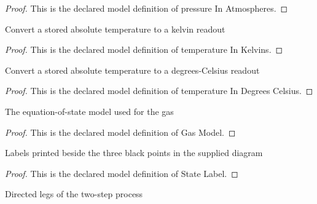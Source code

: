 \begin{proof}
  This is the declared model definition of pressure In Atmospheres.
\end{proof}
\begin{definition}
  \label{def:physics:phyx-mini-0476:phyxminiproblems-problemphyxmini0476-temperatureinkelvins}
  Convert a stored absolute temperature to a kelvin readout
\end{definition}
\begin{proof}
  This is the declared model definition of temperature In Kelvins.
\end{proof}
\begin{definition}
  \label{def:physics:phyx-mini-0476:phyxminiproblems-problemphyxmini0476-temperatureindegreescelsius}
  Convert a stored absolute temperature to a degrees-Celsius readout
\end{definition}
\begin{proof}
  This is the declared model definition of temperature In Degrees Celsius.
\end{proof}
\begin{definition}
  \label{def:physics:phyx-mini-0476:phyxminiproblems-problemphyxmini0476-gasmodel}
  The equation-of-state model used for the gas
\end{definition}
\begin{proof}
  This is the declared model definition of Gas Model.
\end{proof}
\begin{definition}
  \label{def:physics:phyx-mini-0476:phyxminiproblems-problemphyxmini0476-statelabel}
  Labels printed beside the three black points in the supplied diagram
\end{definition}
\begin{proof}
  This is the declared model definition of State Label.
\end{proof}
\begin{definition}
  \label{def:physics:phyx-mini-0476:phyxminiproblems-problemphyxmini0476-processleg}
  Directed legs of the two-step process
\end{definition}
